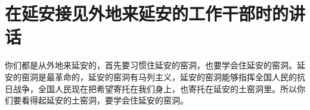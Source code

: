 \section[在延安接见外地来延安的工作干部时的讲话]{在延安接见外地来延安的工作干部时的讲话}


你们都是从外地来延安的，首先要习惯住延安的窑洞，也要学会住延安的窑洞。延安的窑洞是最革命的，延安的窑洞有马列主义，延安的窑洞能够指挥全国人民的抗日战争，全国人民现在把希望寄托在我们身上，也寄托在延安的土窑洞里。所以你们要看得起延安的土窑洞，要学会住延安的窑洞。

